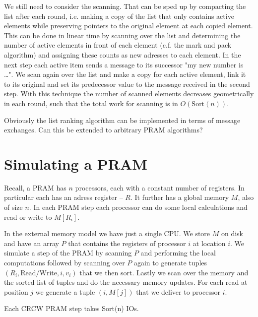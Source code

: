 We still need to consider the scanning. That can be sped up by compacting the list after each round, i.e. making a copy of the list that only contains active elements while preserving pointers to the original element at each copied element. This can be done in linear time by scanning over the list and determining the number of active elements in front of each element (c.f. the mark and pack algorithm) and assigning these counts as new adresses to each element. In the next step each active item sends a message to its successor "my new number is \ldots". We scan again over the list and make a copy for each active element, link it to its original and set its predecessor value to the message received in the second step. With this technique the number of scanned elements decreases geometrically in each round, such that the total work for scanning is in $O(\text{Sort}(n))$.

Obviously the list ranking algorithm can be implemented in terms of message exchanges. Can this be extended to arbitrary PRAM algorithms?

\section{Simulating a PRAM}
	
Recall, a PRAM has $n$ processors, each with a constant number of registers. In particular each has an adress register -- $R$. It further has a global memory $M$, also of size $n$. In each PRAM step each processor can do some local calculations and read or write to $M[R_i]$.

In the external memory model we have just a single CPU. We store $M$ on disk and have an array $P$ that contains the registers of processor $i$ at location $i$. We simulate a step of the PRAM by scanning $P$ and performing the local computations followed by scanning over $P$ again to generate tuples $(R_i, \text{Read/Write}, i, v_i)$ that we then sort. Lastly we scan over the memory and the sorted list of tuples and do the necessary memory updates. For each read at position $j$ we generate a tuple $(i,M[j])$ that we deliver to processor $i$.

\begin{thm} Each CRCW PRAM step takes Sort(n) IOs.\end{thm}
